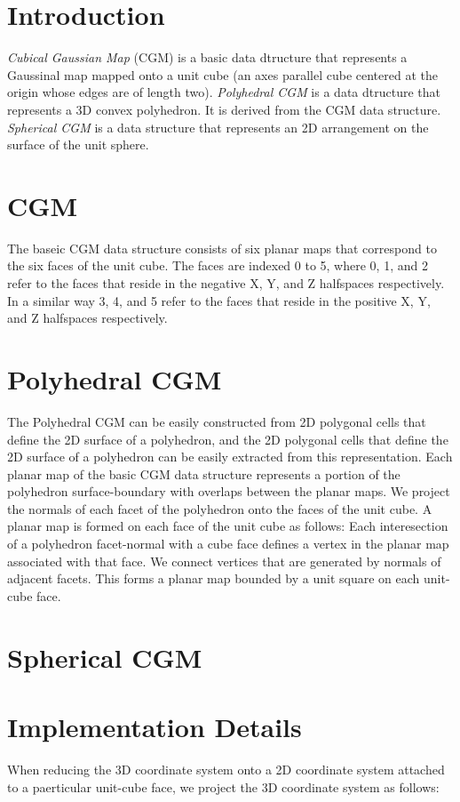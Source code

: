 \section{Introduction\label{CGM_sec:intro}}

{\em Cubical Gaussian Map} (CGM) is a basic data dtructure that represents a
Gaussinal map mapped onto a unit cube (an axes parallel cube centered at the
origin whose edges are of length two). {\em Polyhedral CGM} is a data dtructure
that represents a 3D convex polyhedron. It is derived from the CGM data
structure. {\em Spherical CGM} is a data structure that represents an
2D arrangement on the surface of the unit sphere.

\section{CGM}
The baseic CGM data structure consists of six planar maps that
correspond to the six faces of the unit cube. The faces are indexed 0 to 5,
where 0, 1, and 2 refer to the faces that reside in the negative X, Y, and Z
halfspaces respectively. In a similar way 3, 4, and 5 refer to the faces that
reside in the positive X, Y, and Z halfspaces respectively.

\section{Polyhedral CGM}
The Polyhedral CGM can be easily constructed from 2D polygonal cells that
define the 2D surface of a polyhedron, and the 2D polygonal cells that
define the 2D surface of a polyhedron can be easily extracted from this
representation. Each planar map of the basic CGM data structure represents
a portion of the polyhedron surface-boundary with overlaps between the planar
maps. We project the normals of each facet of the polyhedron onto the faces of
the unit cube. A planar map is formed on each face of the unit cube as follows:
Each interesection of a polyhedron facet-normal with a cube face defines a
vertex in the planar map associated with that face. We connect vertices that
are generated by normals of adjacent facets. This forms a planar map bounded by
a unit square on each unit-cube face.

\section{Spherical CGM}

\section{Implementation Details}
When reducing the 3D coordinate system onto a 2D coordinate system attached
to a paerticular unit-cube face, we project the 3D coordinate system as follows:

